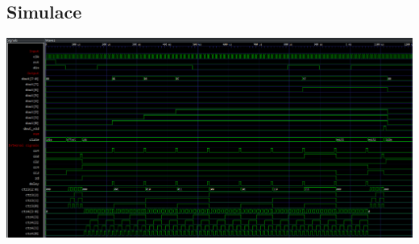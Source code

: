 \documentclass{article}
\begin{document}
\begin{landscape}
    \section{Simulace}
    \includegraphics*[scale=0.5751]{assets/simulation.png}
\end{landscape}
\end{document}
